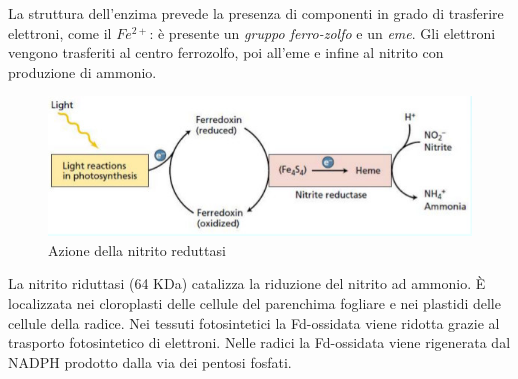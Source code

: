 \documentclass[a4paper,12pt]{book}
\begin{document}
La struttura dell'enzima prevede la presenza di componenti in grado di trasferire elettroni, come il $Fe^{2+}$: è presente un \emph{gruppo ferro-zolfo} e un \emph{eme}. Gli elettroni vengono trasferiti al centro ferrozolfo, poi all'eme e infine al nitrito con produzione di ammonio.
\begin{figure}[H]
\centering
\includegraphics[scale=0.53]{immagini/nitrito_reduttasi.jpg}
\caption{Azione della nitrito reduttasi}
\end{figure}
La nitrito riduttasi (64 KDa) catalizza la riduzione del nitrito ad ammonio. È localizzata nei cloroplasti delle cellule del
parenchima fogliare e nei plastidi delle cellule della radice. Nei tessuti fotosintetici la Fd-ossidata viene ridotta grazie al
trasporto fotosintetico di elettroni. Nelle radici la Fd-ossidata viene rigenerata dal NADPH prodotto dalla via dei pentosi fosfati.
\end{document}
